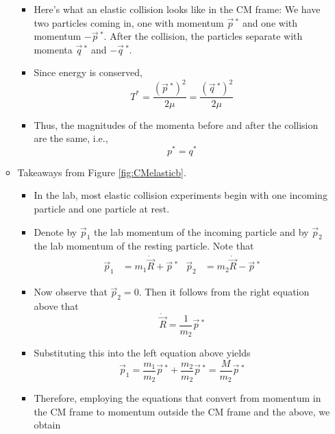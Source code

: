\documentclass[../notes.tex]{subfiles}
\begin{document}
\begin{itemize}
\begin{itemize}
\begin{itemize}
            \item Here's what an elastic collision looks like in the CM frame: We have two particles coming in, one with momentum $\vec{p}{\,}^*$ and one with momentum $-\vec{p}{\,}^*$. After the collision, the particles separate with momenta $\vec{q}{\,}^*$ and $-\vec{q}{\,}^*$.
            \item Since energy is conserved,
            \begin{equation*}
                T^* = \frac{(\vec{p}{\,}^*)^2}{2\mu} = \frac{(\vec{q}{\,}^*)^2}{2\mu}
            \end{equation*}
            \item Thus, the magnitudes of the momenta before and after the collision are the same, i.e.,
            \begin{equation*}
                p^* = q^*
            \end{equation*}
        \end{itemize}
        \item Takeaways from Figure \ref{fig:CMelasticb}.
        \begin{itemize}
            \item In the lab, most elastic collision experiments begin with one incoming particle and one particle at rest.
            \item Denote by $\vec{p}_1$ the lab momentum of the incoming particle and by $\vec{p}_2$ the lab momentum of the resting particle. Note that
            \begin{align*}
                \vec{p}_1 &= m_1\dot{\vec{R}}+\vec{p}{\,}^*&
                \vec{p}_2 &= m_2\dot{\vec{R}}-\vec{p}{\,}^*
            \end{align*}
            \item Now observe that $\vec{p}_2=0$. Then it follows from the right equation above that
            \begin{equation*}
                \dot{\vec{R}} = \frac{1}{m_2}\vec{p}{\,}^*
            \end{equation*}
            \item Substituting this into the left equation above yields
            \begin{equation*}
                \vec{p}_1 = \frac{m_1}{m_2}\vec{p}{\,}^*+\frac{m_2}{m_2}\vec{p}{\,}^* = \frac{M}{m_2}\vec{p}{\,}^*
            \end{equation*}
            \item Therefore, employing the equations that convert from momentum in the CM frame to momentum outside the CM frame and the above, we obtain

\end{itemize}
\end{itemize}
\end{itemize}
\end{document}
